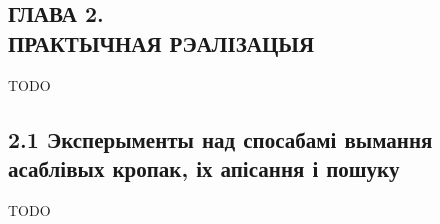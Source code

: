\begin{center}
    \section*{ГЛАВА 2. \\ ПРАКТЫЧНАЯ РЭАЛІЗАЦЫЯ}
\end{center}

\renewcommand{\floatpagefraction}{.8}%

TODO

\vspace{5mm}

\subsection*{2.1 Эксперыменты над спосабамі вымання асаблівых кропак, іх апісання і пошуку}

TODO

\newpage
